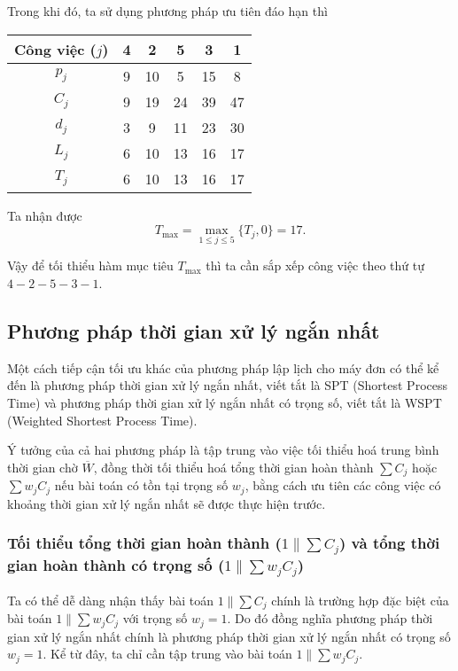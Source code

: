 \documentclass[12pt,a4paper]{report}
\begin{document}
Trong khi đó, ta sử dụng phương pháp ưu tiên đáo hạn thì

\begin{table}[h!]
	\centering
	\begin{tabular}{|c | c c c c c |} 
	\hline
	Công việc ($j$) & 4 & 2 & 5 & 3 & 1 \\
	\hline\hline
	$p_j$ & 9 & 10 & 5 & 15 & 8 \\
	$C_j$ & 9 & 19 & 24 & 39 & 47 \\
	$d_j$ & 3 & 9 & 11 & 23 & 30 \\
	$L_j$ & 6 & 10 & 13 & 16 & 17 \\
	$T_j$ & 6 & 10 & 13 & 16 & 17 \\
	\hline
	\end{tabular}
\end{table}

Ta nhận được
\begin{equation*}
	T_{\max} = \max _{1 \leq j \leq 5} \{T_j, 0\} = 17.
\end{equation*}

Vậy để tối thiểu hàm mục tiêu $T_{\max}$ thì ta cần sắp xếp công việc theo thứ tự $4-2-5-3-1$.
\subsection{Phương pháp thời gian xử lý ngắn nhất}
Một cách tiếp cận tối ưu khác của phương pháp lập lịch cho máy đơn có thể kể đến là phương pháp thời gian xử lý ngắn nhất, viết tắt là SPT (Shortest Process Time) và phương pháp thời gian xử lý ngắn nhất có trọng số, viết tắt là WSPT (Weighted Shortest Process Time).

Ý tưởng của cả hai phương pháp là tập trung vào việc tối thiểu hoá trung bình thời gian chờ $\overline{W}$, đồng thời tối thiểu hoá tổng thời gian hoàn thành $\sum C_j$ hoặc $\sum w_j C_j$ nếu bài toán có tồn tại trọng số $w_j$, bằng cách ưu tiên các công việc có khoảng thời gian xử lý ngắn nhất sẽ được thực hiện trước. 

\subsubsection*{Tối thiểu tổng thời gian hoàn thành ($1 \| \sum C_j$) và tổng thời gian hoàn thành có trọng số ($1 \| \sum w_j C_j$)}
Ta có thể dễ dàng nhận thấy bài toán $1 \| \sum C_j$ chính là trường hợp đặc biệt của bài toán $1 \| \sum w_j C_j$ với trọng số $w_j=1$. Do đó đồng nghĩa phương pháp thời gian xử lý ngắn nhất chính là phương pháp thời gian xử lý ngắn nhất có trọng số $w_j=1$. Kể từ đây, ta chỉ cần tập trung vào bài toán $1\| \sum w_j C_j$.
\end{document}
